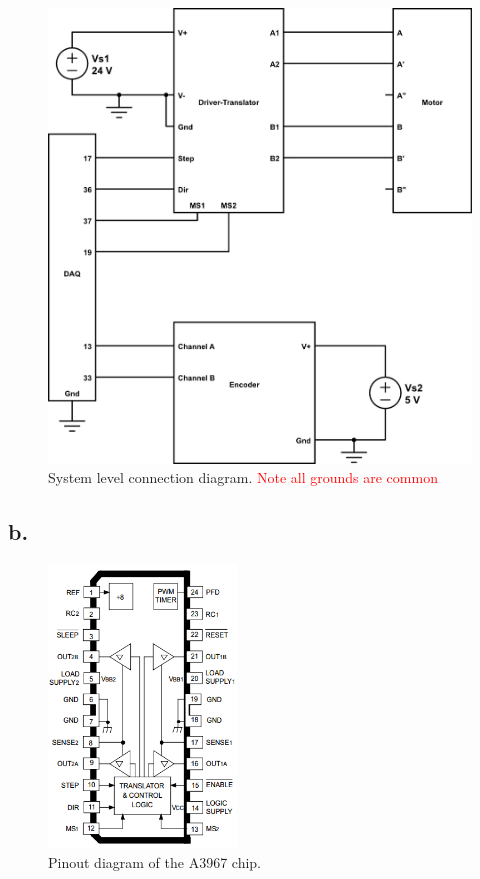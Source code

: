 \documentclass{article}
\newcommand{\xxx}[1]{\textcolor{red}{#1}}
\theoremstyle{plain}
\theoremstyle{definition}
\theoremstyle{remark}
\begin{document}
\begin{figure}[htb]
\begin{center}
\includegraphics[width = 12cm]{lab5_main.png}
\caption{System level connection diagram. \xxx{Note all grounds are common}}
\label{q1_a}
\end{center}
\end{figure}

\subsection*{b.}
\begin{figure}[htb]
\begin{center}
\includegraphics[width = 5cm]{A3967_pinout.png}
\caption{Pinout diagram of the A3967 chip.}
\label{q1_b}
\end{center}
\end{figure}
\end{document}
